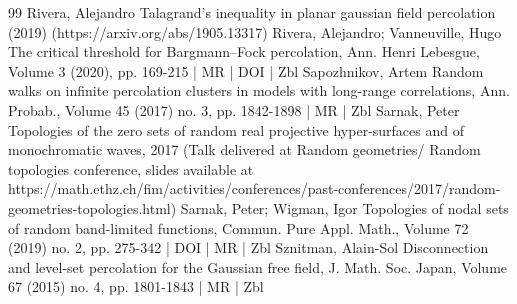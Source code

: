\begin{thebibliography}{99}
Rivera, Alejandro Talagrand’s inequality in planar gaussian field percolation (2019) (https://arxiv.org/abs/1905.13317)
Rivera, Alejandro; Vanneuville, Hugo The critical threshold for Bargmann–Fock percolation, Ann. Henri Lebesgue, Volume 3 (2020), pp. 169-215 | MR | DOI | Zbl
Sapozhnikov, Artem Random walks on infinite percolation clusters in models with long-range correlations, Ann. Probab., Volume 45 (2017) no. 3, pp. 1842-1898 | MR | Zbl
Sarnak, Peter Topologies of the zero sets of random real projective hyper-surfaces and of monochromatic waves, 2017 (Talk delivered at Random geometries/ Random topologies conference, slides available at https://math.ethz.ch/fim/activities/conferences/past-conferences/2017/random-geometries-topologies.html)
Sarnak, Peter; Wigman, Igor Topologies of nodal sets of random band-limited functions, Commun. Pure Appl. Math., Volume 72 (2019) no. 2, pp. 275-342 | DOI | MR | Zbl
Sznitman, Alain-Sol Disconnection and level-set percolation for the Gaussian free field, J. Math. Soc. Japan, Volume 67 (2015) no. 4, pp. 1801-1843 | MR | Zbl
\end{thebibliography}
